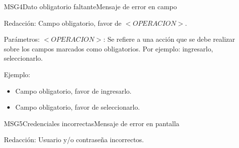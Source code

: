    
\begin{mensaje}{MSG4}{Dato obligatorio faltante}{Mensaje de error en campo}
	\item[Redacción:] Campo obligatorio, favor de $<OPERACION>$.
    \item[Parámetros:] $<OPERACION>$: Se refiere a una acción que se debe realizar sobre los campos marcados como obligatorios. Por ejemplo: ingresarlo, seleccionarlo.
    

    \item[Ejemplo:]\begin{itemize}
        
        \item Campo obligatorio, favor de ingresarlo.  
        \item Campo obligatorio, favor de seleccionarlo.
    \end{itemize} 
\end{mensaje}


\begin{mensaje}{MSG5}{Credenciales incorrectas}{Mensaje de error en pantalla}
	\item[Redacción:] Usuario y/o contraseña incorrectos.
\end{mensaje}

